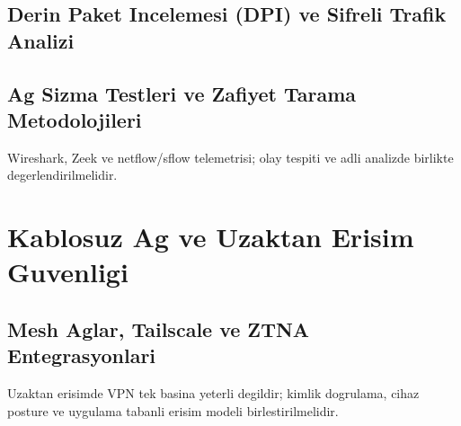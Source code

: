 \subsection{Derin Paket Incelemesi (DPI) ve Sifreli Trafik Analizi}
\subsection{Ag Sizma Testleri ve Zafiyet Tarama Metodolojileri}
Wireshark, Zeek ve netflow/sflow telemetrisi; olay tespiti ve adli analizde birlikte degerlendirilmelidir.

\section{Kablosuz Ag ve Uzaktan Erisim Guvenligi}
\subsection{Mesh Aglar, Tailscale ve ZTNA Entegrasyonlari}
Uzaktan erisimde VPN tek basina yeterli degildir; kimlik dogrulama, cihaz posture ve uygulama tabanli erisim modeli birlestirilmelidir.
